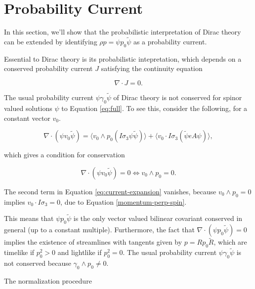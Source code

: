 \documentclass{article}
\begin{document}
  \section{Probability Current}\label{probability}

  In this section, we'll show that the probabilistic interpretation of Dirac theory can be extended by identifying $\rho p = \psi p_0 \widetilde \psi$ as a probability current.

  Essential to Dirac theory is its probabilistic intepretation, which depends on a conserved probability current $J$ satisfying the continuity equation

  \begin{equation}
    \nabla \cdot J = 0.
  \end{equation}

  The usual probability current $\psi \gamma_0 \widetilde \psi$ of Dirac theory is not conserved for spinor valued solutions $\psi$ to Equation \ref{eq:full}. To see this, consider the following, for a constant vector $v_0$.

  \begin{equation}
    \nabla \cdot (\psi v_0 \widetilde \psi) = \langle v_0 \wedge p_0 (I \sigma_3 \psi \widetilde \psi) \rangle + \langle v_0 \cdot I \sigma_3 (\widetilde \psi e A \psi) \rangle,\label{eq:current-expansion}
  \end{equation}

  which gives a condition for conservation

  \begin{equation}
    \nabla \cdot (\psi v_0 \widetilde \psi) = 0 \iff v_0 \wedge p_0 = 0.
  \end{equation}

  The second term in Equation \ref{eq:current-expansion} vanishes, because $v_0 \wedge p_0 = 0$ implies $v_0 \cdot I \sigma_3 = 0$, due to Equation \ref{momentum-perp-spin}.

  This means that $\psi p_0 \widetilde \psi$ is the only vector valued bilinear covariant conserved in general (up to a constant multiple). Furthermore, the fact that $\nabla \cdot (\psi p_0 \widetilde \psi) = 0$ implies the existence of streamlines with tangents given by $p = R p_0 \widetilde R$, which are timelike if $p_0^2 > 0$ and lightlike if $p_0^2 = 0$.\cite{hestenes} The usual probability current $\psi \gamma_0 \widetilde \psi$ is not conserved because $\gamma_0 \wedge p_0 \not= 0$.

  The normalization procedure
\end{document}
